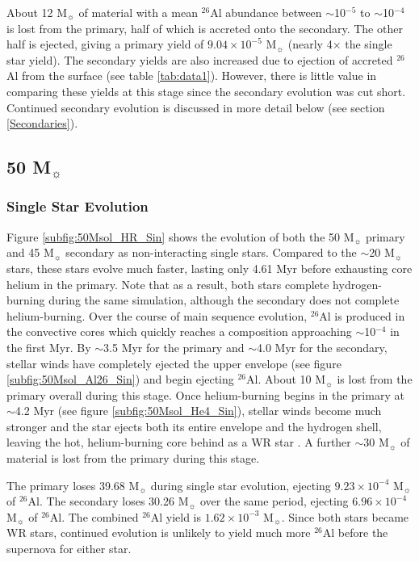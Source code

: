 About 12 M$_{\sun}$ of material with a mean $^{26}$Al abundance between $\sim$10$^{-5}$ to $\sim$10$^{-4}$ is lost from the primary, half of which is accreted onto the secondary. The other half is ejected, giving a primary yield of $9.04\times10^{-5}$ M$_{\sun}$ (nearly 4$\times$ the single star yield).
The secondary yields are also increased due to ejection of accreted $^{26}$Al from the surface (see table \ref{tab:data1}).
However, there is little value in comparing these yields at this stage since the secondary evolution was cut short. Continued secondary evolution is discussed in more detail below (see section \ref{Secondaries}).

\subsection{50 M$_{\sun}$}

\subsubsection{Single Star Evolution}

Figure \ref{subfig:50Msol_HR_Sin} shows the evolution of both the 50 M$_{\sun}$ primary and 45 M$_{\sun}$ secondary as non-interacting single stars.
Compared to the $\sim$20 M$_{\sun}$ stars, these stars evolve much faster, lasting only 4.61 Myr before exhausting core helium in the primary.
Note that as a result, both stars complete hydrogen-burning during the same simulation, although the secondary does not complete helium-burning.
Over the course of main sequence evolution, $^{26}$Al is produced in the convective cores which quickly reaches a composition approaching $\sim$10$^{-4}$ in the first Myr.
By $\sim$3.5 Myr for the primary and $\sim$4.0 Myr for the secondary, stellar winds have completely ejected the upper envelope (see figure \ref{subfig:50Msol_Al26_Sin}) and begin ejecting $^{26}$Al. About 10 M$_{\sun}$ is lost from the primary overall during this stage.
Once helium-burning begins in the primary at $\sim$4.2 Myr (see figure \ref{subfig:50Msol_He4_Sin}), stellar winds become much stronger and the star ejects both its entire envelope and the hydrogen shell, leaving the hot, helium-burning core behind as a WR star \citep[see][]{Carroll2007}.
A further $\sim$30 M$_{\sun}$ of material is lost from the primary during this stage.

The primary loses 39.68 M$_{\sun}$ during single star evolution, ejecting $9.23\times10^{-4}$ M$_{\sun}$ of $^{26}$Al.
The secondary loses 30.26 M$_{\sun}$ over the same period, ejecting $6.96\times10^{-4}$ M$_{\sun}$ of $^{26}$Al.
The combined $^{26}$Al yield is $1.62\times10^{-3}$ M$_{\sun}$. Since both stars became WR stars, continued evolution is unlikely to yield much more $^{26}$Al before the supernova for either star.

